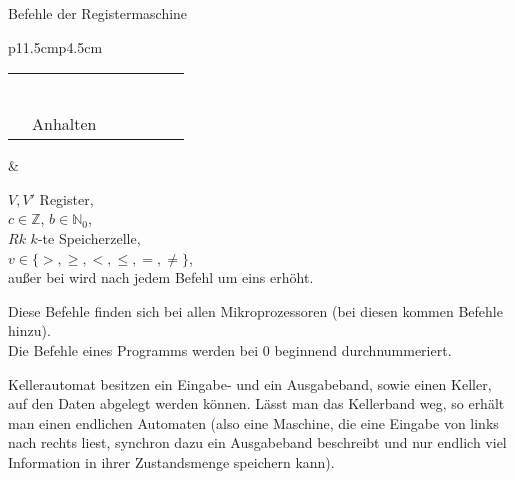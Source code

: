 \begin{Def}{Befehle der Registermaschine} \\
    \begin{tabular}{p{11.5cm}p{4.5cm}}
        \begin{minipage}[c]{11.5cm}
    \begin{tabular}{lp{3cm}|ll|lll}
\assembler{load V,c} & \pseudocode{V := c} &
\assembler{copy V,V'} & \pseudocode{V := V'} \\
\assembler{read V} & \pseudocode{V := R<A>} &
\assembler{write V} & \pseudocode{R<A> := V} \\
\assembler{add} & \pseudocode{X := Y + Z} &
\assembler{sub} & \pseudocode{X := Y - Z} \\
\assembler{succ} & \pseudocode{X := X + 1} &
\assembler{shift} & \pseudocode{X := X div 2} \\ \hline
\assembler{comp (v)} &
\multicolumn{3}{l|}{\pseudocode{if XvY then F := 1 else F := 0 fi}} \\
\assembler{jump b} &
\multicolumn{3}{l|}{\pseudocode{if F=1 then B := b else B := B + 1 fi}} \\ \hline
\assembler{stop} & Anhalten
    \end{tabular}
        \end{minipage}
        &
        \begin{minipage}[c]{4.5cm}
            $V, V'$ Register, \\
            $c \in \mathbb{Z}$, \quad
            $b \in \mathbb{N}_0$, \\
            $Rk$ $k$-te Speicherzelle, \\
            $v \in \{>, \ge, <, \le, =, \not=\}$, \\
            außer bei  wird nach jedem Befehl 
            um eins erhöht.
        \end{minipage}
    \end{tabular}
    
    Diese Befehle finden sich bei allen Mikroprozessoren (bei diesen kommen
    Befehle hinzu). \\
    Die Befehle eines Programms werden bei 0 beginnend durchnummeriert.
\end{Def}

\begin{Def}{Kellerautomat}
     besitzen ein Eingabe- und ein
    Ausgabeband, sowie einen Keller, auf den Daten abgelegt werden können.
    Lässt man das Kellerband weg, so erhält man einen endlichen Automaten
    (also eine Maschine, die eine Eingabe von links nach rechts liest,
    synchron dazu ein Ausgabeband beschreibt und nur endlich viel Information
    in ihrer Zustandsmenge speichern kann).
\end{Def}

